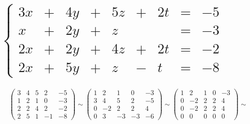\documentclass[12pt]{article}
\begin{document}
\begin{sloppypar}

    \section{$
          \left\{\begin{array}{rcrcrcrcr}
              3x & + & 4y & + & 5z & + & 2t & = & -5 \\
              x  & + & 2y & + & z  &   &    & = & -3 \\
              2x & + & 2y & + & 4z & + & 2t & = & -2 \\
              2x & + & 5y & + & z  & - & t  & = & -8
          \end{array}\right.
      $}
    \begin{align*}
         & \left(\begin{array}{rrrr|r}
                     3 & 4 & 5 & 2  & -5 \\
                     1 & 2 & 1 & 0  & -3 \\
                     2 & 2 & 4 & 2  & -2 \\
                     2 & 5 & 1 & -1 & -8
                 \end{array}\right)
        \sim
        \left(\begin{array}{rrrr|r}
                  1 & 2  & 1  & 0  & -3 \\
                  3 & 4  & 5  & 2  & -5 \\
                  0 & -2 & 2  & 2  & 4  \\
                  0 & 3  & -3 & -3 & -6
              \end{array}\right)
        \sim
        \left(\begin{array}{rrrr|r}
                  1 & 2  & 1 & 0 & -3 \\
                  0 & -2 & 2 & 2 & 4  \\
                  0 & -2 & 2 & 2 & 4  \\
                  0 & 0  & 0 & 0 & 0
              \end{array}\right)
        \sim                          \\

\end{align*}
\end{sloppypar}
\end{document}
